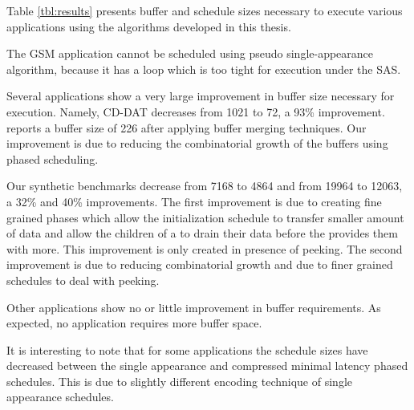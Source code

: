 \begin{comment}
\begin{figure}
\centering \psfig{figure=kz-1.eps,width=6in} \caption[Buffer
storage space savings of Phased Minimal Latency schedule vs.
Hierarchical schedule.]{Buffer storage space savings of Phased
Minimal Latency schedule vs. Hierarchical schedule. All data in
all {\Channels} is assume to consume same amount of space.}
\end{figure}

\begin{figure}
\centering \psfig{figure=kz-2.eps,width=6in} \caption[Storage
usage comparison]{Storage usage for compressed Minimal Latency
Phased schedule vs. Hierarchical schedule. Left bars are for
Hierarchical schedules. Numbers are normalized to total storage
required by Hierarchical schedule. Each entry in every schedule
and data items in all {\Channels} are assumed to consume same
amount of space.}
\end{figure}
\end{comment}

Table \ref{tbl:results} presents buffer and schedule sizes
necessary to execute various applications using the algorithms
developed in this thesis.

The GSM application cannot be scheduled using pseudo
single-appearance algorithm, because it has a loop which is too
tight for execution under the SAS.

Several applications show a very large improvement in buffer size
necessary for execution.  Namely, CD-DAT decreases from 1021 to
72, a 93\% improvement. \cite{murthy99buffer} reports a buffer
size of 226 after applying buffer merging techniques. Our
improvement is due to reducing the combinatorial growth of the
buffers using phased scheduling.

Our synthetic benchmarks decrease from 7168 to 4864 and from 19964
to 12063, a 32\% and 40\% improvements. The first improvement is
due to creating fine grained phases which allow the initialization
schedule to transfer smaller amount of data and allow the children
of a {\splitjoin} to drain their data before the {\splitter}
provides them with more. This improvement is only created in
presence of peeking. The second improvement is due to reducing
combinatorial growth and due to finer grained schedules to deal
with peeking.

Other applications show no or little improvement in buffer
requirements. As expected, no application requires more buffer
space.

It is interesting to note that for some applications the schedule
sizes have decreased between the single appearance and compressed
minimal latency phased schedules. This is due to slightly
different encoding technique of single appearance schedules.
